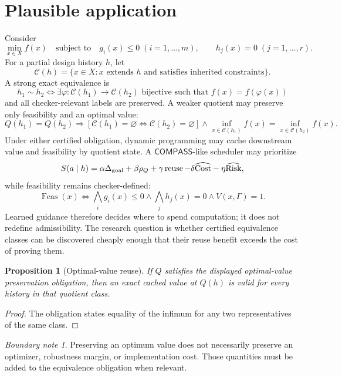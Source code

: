 \documentclass[11pt,oneside]{book}
\newtheorem{proposition}[theorem]{Proposition}
\theoremstyle{definition}
\theoremstyle{remark}
\newtheorem{boundary}[theorem]{Boundary note}
\newcommand{\COMPASS}{\mathsf{COMPASS}}
\newcommand{\Cost}{\operatorname{Cost}}
\newcommand{\Risk}{\operatorname{Risk}}
\begin{document}
\section{Plausible application}
Consider
\[
\min_{x\in X} f(x)
\quad\text{subject to}\quad
g_i(x)\le0\;(i=1,\ldots,m),
\qquad h_j(x)=0\;(j=1,\ldots,r).
\]
For a partial design history \(h\), let
\[
\mathcal C(h)=\{x\in X:x\text{ extends }h\text{ and satisfies inherited constraints}\}.
\]
A strong exact equivalence is
\[
h_1\sim h_2
\iff
\exists\varphi:\mathcal C(h_1)\to\mathcal C(h_2)\text{ bijective such that }
f(x)=f(\varphi(x))
\]
and all checker-relevant labels are preserved. A weaker quotient may preserve only feasibility and an
optimal value:
\[
Q(h_1)=Q(h_2)
\Rightarrow
\left[
\mathcal C(h_1)=\varnothing\iff\mathcal C(h_2)=\varnothing
\right]
\land
\inf_{x\in\mathcal C(h_1)}f(x)=\inf_{x\in\mathcal C(h_2)}f(x).
\]
Under either certified obligation, dynamic programming may cache downstream value and feasibility
by quotient state. A \(\COMPASS\)-like scheduler may prioritize
\[
S(a\mid h)=
\alpha\Delta_{\rm goal}+\beta\rho_Q+\gamma\operatorname{reuse}
-\delta\widehat{\Cost}-\eta\widehat{\Risk},
\]
while feasibility remains checker-defined:
\[
\operatorname{Feas}(x)
\iff
\bigwedge_i g_i(x)\le0
\land\bigwedge_j h_j(x)=0
\land V(x,\Gamma)=1.
\]
Learned guidance therefore decides where to spend computation; it does not redefine admissibility.
The research question is whether certified equivalence classes can be discovered cheaply enough that
their reuse benefit exceeds the cost of proving them.

\begin{proposition}[Optimal-value reuse]
If \(Q\) satisfies the displayed optimal-value preservation obligation, then an exact cached value at
\(Q(h)\) is valid for every history in that quotient class.
\end{proposition}

\begin{proof}
The obligation states equality of the infimum for any two representatives of the same class.
\end{proof}

\begin{boundary}
Preserving an optimum value does not necessarily preserve an optimizer, robustness margin, or
implementation cost. Those quantities must be added to the equivalence obligation when relevant.
\end{boundary}
\end{document}
